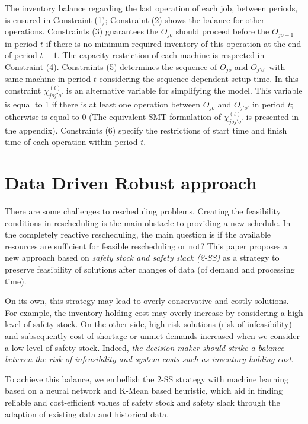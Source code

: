\documentclass[letterpaper]{article} %
\begin{document}
The inventory balance regarding the last operation of each job, between periods, is ensured in Constraint (1); Constraint (2) shows the balance for other operations. Constraints (3) guarantees the $O_{jo}$ should proceed before the $O_{jo+1}$ in period $t$ if there is no minimum required inventory of this operation at the end of period $t-1$. The capacity restriction of each machine is respected in Constraint (4). Constraints (5) determines the sequence of $O_{jo}$ and $O_{j'o'}$ with same machine in period $t$ considering the sequence dependent setup time. In this constraint $\chi_{joj'o'}^{(t)}$ is an alternative variable for simplifying the model. This variable is equal to 1 if there is at least one operation between $O_{jo}$ and $O_{j'o'}$ in period $t$; otherwise is equal to 0 (The equivalent SMT formulation of $\chi_{joj'o'}^{(t)}$ is presented in the appendix). Constraints (6) specify the restrictions of start time and finish time of each operation within period $t$.

\section{Data Driven Robust approach}
There are some challenges to rescheduling problems. Creating the feasibility conditions in rescheduling is the main obstacle to providing a new schedule. In the completely reactive rescheduling, the main question is if the available resources are sufficient for feasible rescheduling or not? This paper proposes a new approach based on \emph{safety stock and safety slack (2-SS)} as a strategy to preserve feasibility of solutions after changes of data (of demand and processing time).

On its own, this strategy may lead to overly conservative and costly solutions. For example, the inventory holding cost may overly increase by considering a high level of safety stock. On the other side, high-risk solutions (risk of infeasibility) and subsequently cost of shortage or unmet demands increased when we consider a low level of safety stock. Indeed, {\it the decision-maker should strike a balance between the risk of infeasibility and system costs such as inventory holding cost}.
%

To achieve this balance, we embellish the 2-SS strategy with machine
learning based on a neural network and \mbox{K-Mean} based heuristic,  which
aid in finding reliable and cost-efficient values of safety stock and safety slack through the adaption of
existing data and historical data. 
\end{document}
